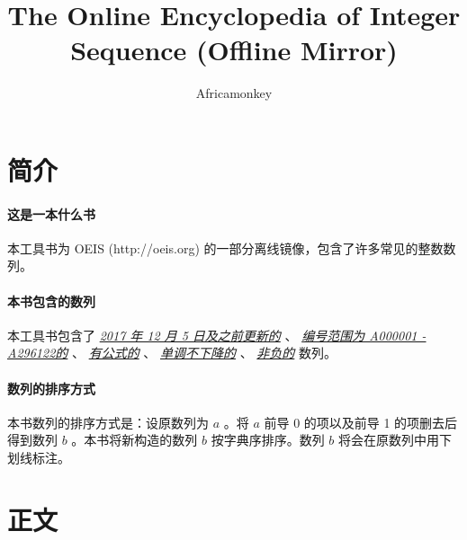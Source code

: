 \documentclass{article}
\begin{document}
\title{The Online Encyclopedia of Integer Sequence (Offline Mirror)}
\author {Africamonkey}
\maketitle

\section{简介}

\paragraph{这是一本什么书}

本工具书为 OEIS (http://oeis.org) 的一部分离线镜像，包含了许多常见的整数数列。

\paragraph{本书包含的数列}

本工具书包含了 \underline{\emph{2017 年 12 月 5 日及之前更新的}} 、 \underline{\emph{编号范围为 A000001 - A296122的}} 、 \underline{\emph{有公式的}} 、 \underline{\emph{单调不下降的}} 、 \underline{\emph{非负的}} 数列。

\paragraph{数列的排序方式}

本书数列的排序方式是：设原数列为 $a$ 。将 $a$ 前导 0 的项以及前导 1 的项删去后得到数列 $b$ 。本书将新构造的数列 $b$ 按字典序排序。数列 $b$ 将会在原数列中用下划线标注。

\section{正文}

\footnotesize


\end{document}

